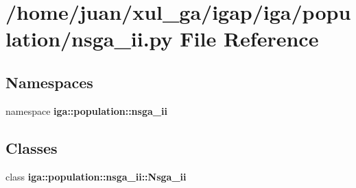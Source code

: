 \section{/home/juan/xul\_\-ga/igap/iga/population/nsga\_\-ii.py File Reference}
\label{nsga__ii_8py}
\subsection*{Namespaces}
\begin{CompactItemize}
\item 
namespace {\bf iga::population::nsga\_\-ii}
\end{CompactItemize}
\subsection*{Classes}
\begin{CompactItemize}
\item 
class {\bf iga::population::nsga\_\-ii::Nsga\_\-ii}
\end{CompactItemize}
